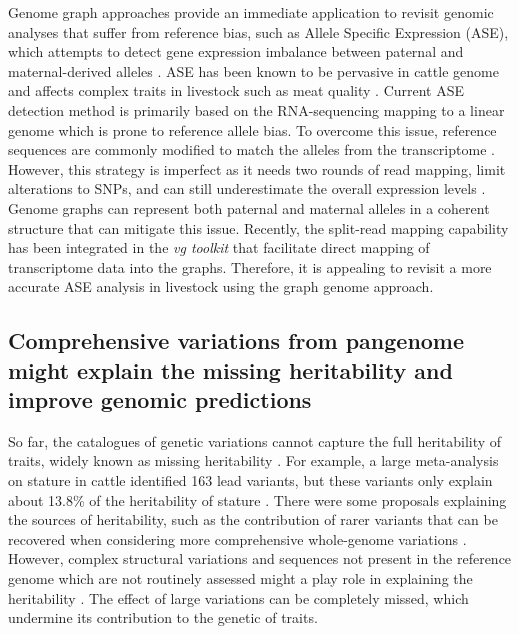 \documentclass[../main.tex]{subfiles}
\begin{document}
Genome graph approaches provide an immediate application to revisit genomic analyses that suffer from reference bias, such as Allele Specific Expression (ASE), which attempts to detect gene expression imbalance between paternal and maternal-derived alleles \citep{castel2020vast}. ASE has been known to be pervasive in cattle genome \citep{chamberlain2015extensive} and affects complex traits in livestock such as meat quality \citep{guillocheau2019survey,bruscadin2021muscle}. Current ASE detection method is primarily based on the RNA-sequencing mapping to a linear genome which is prone to reference allele bias. To overcome this issue, reference sequences are commonly modified to match the alleles from the transcriptome \citep{salavati2019elimination}. However, this strategy is imperfect as it needs two rounds of read mapping, limit alterations to SNPs, and can still underestimate the overall expression levels \citep{van2015wasp}. Genome graphs can represent both paternal and maternal alleles in a coherent structure that can mitigate this issue. Recently, the split-read mapping capability has been integrated in the \emph{vg toolkit} \citep{Sibbesen2021} that facilitate direct mapping of transcriptome data into the graphs. Therefore, it is appealing to revisit a more accurate ASE analysis in livestock using the graph genome approach. 

\subsection*{Comprehensive variations from pangenome might explain the missing heritability and improve genomic predictions}

So far, the catalogues of genetic variations cannot capture the full heritability of traits, widely known as missing heritability \citep{maher2008personal}. For example, a large meta-analysis on stature in cattle identified 163 lead variants, but these variants only explain about 13.8\% of the heritability of stature \citep{bouwman2018meta}. There were some proposals explaining the sources of heritability, such as the contribution of rarer variants \citep{gonzalez2015rare} that can be recovered when considering more comprehensive whole-genome variations \citep{wainschtein2019recovery}. However, complex structural variations and sequences not present in the reference genome which are not routinely assessed might 
a play role in explaining the heritability \citep{genin2020missing,theunissen2020structural}. The effect of large variations can be completely missed, which undermine its contribution to the genetic of traits. 
\end{document}
